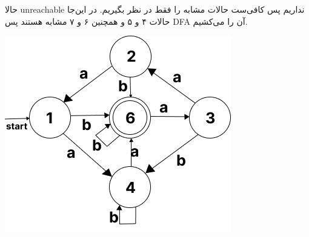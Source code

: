 حالا unreachable نداریم پس کافی‌ست حالات مشابه را فقط در نظر بگیریم. در این‌جا حالات ۴ و ۵ و همچنین ۶ و ۷ مشابه هستند پس DFA آن را می‌کشیم.

\begin{center}
	\includegraphics{DFA6}
\end{center}

